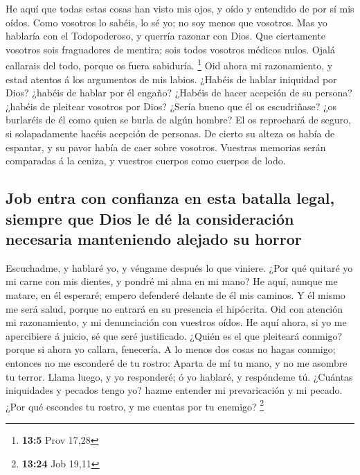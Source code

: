  He aquí que todas estas cosas han visto mis ojos, y oído y
entendido de por sí mis oídos.  Como vosotros lo sabéis, lo
sé yo; no soy menos que vosotros.  Mas yo hablaría con el
Todopoderoso, y querría razonar con Dios.  Que ciertamente
vosotros sois fraguadores de mentira; sois todos vosotros médicos nulos.
 Ojalá callarais del todo, porque os fuera sabiduría.
\footnote{\textbf{13:5} Prov 17,28}  Oid ahora mi
razonamiento, y estad atentos á los argumentos de mis labios.
 ¿Habéis de hablar iniquidad por Dios? ¿habéis de hablar por
él engaño?  ¿Habéis de hacer acepción de su persona? ¿habéis
de pleitear vosotros por Dios?  ¿Sería bueno que él os
escudriñase? ¿os burlaréis de él como quien se burla de algún hombre?
 El os reprochará de seguro, si solapadamente hacéis
acepción de personas.  De cierto su alteza os había de
espantar, y su pavor había de caer sobre vosotros. 
Vuestras memorias serán comparadas á la ceniza, y vuestros cuerpos como
cuerpos de lodo.

\hypertarget{job-entra-con-confianza-en-esta-batalla-legal-siempre-que-dios-le-duxe9-la-consideraciuxf3n-necesaria-manteniendo-alejado-su-horror}{%
\subsection{Job entra con confianza en esta batalla legal, siempre que
Dios le dé la consideración necesaria manteniendo alejado su
horror}\label{job-entra-con-confianza-en-esta-batalla-legal-siempre-que-dios-le-duxe9-la-consideraciuxf3n-necesaria-manteniendo-alejado-su-horror}}

 Escuchadme, y hablaré yo, y véngame después lo que
viniere.  ¿Por qué quitaré yo mi carne con mis dientes, y
pondré mi alma en mi mano?  He aquí, aunque me matare, en
él esperaré; empero defenderé delante de él mis caminos.  Y
él mismo me será salud, porque no entrará en su presencia el hipócrita.
 Oid con atención mi razonamiento, y mi denunciación con
vuestros oídos.  He aquí ahora, si yo me apercibiere á
juicio, sé que seré justificado.  ¿Quién es el que
pleiteará conmigo? porque si ahora yo callara, fenecería. 
A lo menos dos cosas no hagas conmigo; entonces no me esconderé de tu
rostro:  Aparta de mí tu mano, y no me asombre tu terror.
 Llama luego, y yo responderé; ó yo hablaré, y respóndeme
tú.  ¿Cuántas iniquidades y pecados tengo yo? hazme
entender mi prevaricación y mi pecado.  ¿Por qué escondes
tu rostro, y me cuentas por tu enemigo? \footnote{\textbf{13:24} Job
  19,11}

